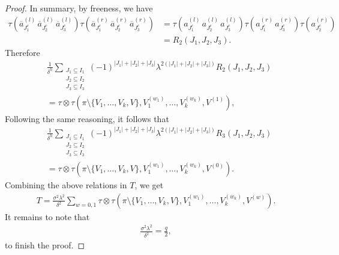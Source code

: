 \documentclass[12pt,reqno]{amsart}
\theoremstyle{plain}
\newcommand{\1}{\mathbf{1}}
\begin{document}
\begin{proof}
    In summary, by freeness, we have
    \begin{align*}
        \tau\left(\overline{a}_{J_1^c}^{(l)}\, \overline{a}_{J_2^c}^{(l)}\, \overline{a}_{J_3^c}^{(l)}\right)\tau\left(\overline{a}_{J_1^c}^{(r)}\, \overline{a}_{J_2^c}^{(r)}\, \overline{a}_{J_3^c}^{(r)}\right)&=\tau\left(a_{J_1^c}^{(l)}\, a_{J_2^c}^{(l)}\, a_{J_3^c}^{(l)}\right)\tau\left(a_{J_1^c}^{(r)}\, a_{J_3^c}^{(r)}\right)\tau\left(a_{J_2^c}^{(r)}\right)\\
        &=R_2(J_1,J_2,J_3).
    \end{align*}
    Therefore
    \begin{align*}
        &\frac{1}{\delta^h}\sum_{\substack{J_1 \subseteq I_1\\ J_2 \subseteq I_2\\ J_3 \subseteq I_3}}(-1)^{|J_1|+|J_2|+|J_3|}\lambda^{2(|J_1|+|J_2|+|J_3|)}R_2(J_1,J_2,J_3)\\
        &=\tau\otimes \tau\left(\pi\setminus\{V_1,\ldots,V_k,V\},V_1^{(w_1)},\ldots,V_k^{(w_k)},V^{(1)}\right),
    \end{align*}
    Following the same reasoning, it follows that
    \begin{align*}
        &\frac{1}{\delta^h}\sum_{\substack{J_1 \subseteq I_1\\ J_2 \subseteq I_2\\ J_3 \subseteq I_3}}(-1)^{|J_1|+|J_2|+|J_3|}\lambda^{2(|J_1|+|J_2|+|J_3|)}R_3(J_1,J_2,J_3)\\
        &=\tau\otimes \tau\left(\pi\setminus\{V_1,\ldots,V_k,V\},V_1^{(w_1)},\ldots,V_k^{(w_k)},V^{(0)}\right).
    \end{align*}
    Combining the above relations in $T$, we get
    \begin{align*}
        T=\frac{\sigma^2\lambda^2}{\delta^2}\sum_{w=0,1}\tau\otimes \tau\left(\pi\setminus\{V_1,\ldots,V_k,V\},V_1^{(w_1)},\ldots,V_k^{(w_k)},V^{(w)}\right).
    \end{align*}
    It remains to note that 
    \begin{align*}
        \frac{\sigma^2\lambda^2}{\delta^2}=\frac{q}{2},
    \end{align*}
    to finish the proof. 
\end{proof}
\end{document}
